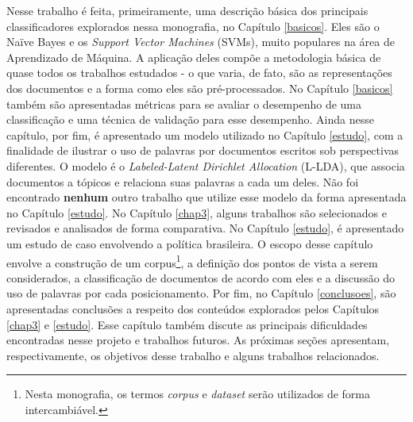 Nesse trabalho é feita, primeiramente, uma descrição básica dos principais classificadores explorados nessa monografia, no Capítulo \ref{basicos}. Eles são o Naïve Bayes e os \emph{Support Vector Machines} (SVMs), muito populares na área de Aprendizado de Máquina. A aplicação deles compõe a metodologia básica de quase todos os trabalhos estudados - o que varia, de fato, são as representações dos documentos e a forma como eles são pré-processados. No Capítulo \ref{basicos} também são apresentadas métricas para se avaliar o desempenho de uma classificação e uma técnica de validação para esse desempenho. Ainda nesse capítulo, por fim, é apresentado um modelo utilizado no Capítulo \ref{estudo}, com a finalidade de ilustrar o uso de palavras por documentos escritos sob perspectivas diferentes. O modelo é o \emph{Labeled-Latent Dirichlet Allocation} (L-LDA), que associa documentos a tópicos e relaciona suas palavras a cada um deles. Não foi encontrado \textbf{nenhum} outro trabalho que utilize esse modelo da forma apresentada no Capítulo \ref{estudo}. No Capítulo \ref{chap3}, alguns trabalhos são selecionados e revisados e analisados de forma comparativa. No Capítulo \ref{estudo}, é apresentado um estudo de caso envolvendo a política brasileira. O escopo desse capítulo envolve a construção de um corpus\footnote{Nesta monografia, os termos \emph{corpus} e \emph{dataset} serão utilizados de forma intercambiável.}, a definição dos pontos de vista a serem considerados, a classificação de documentos de acordo com eles e a discussão do uso de palavras por cada posicionamento. Por fim, no Capítulo \ref{conclusoes}, são apresentadas conclusões a respeito dos conteúdos explorados pelos Capítulos \ref{chap3} e \ref{estudo}. Esse capítulo também discute as principais dificuldades encontradas nesse projeto e trabalhos futuros. As próximas seções apresentam, respectivamente, os objetivos desse trabalho e alguns trabalhos relacionados.




   


